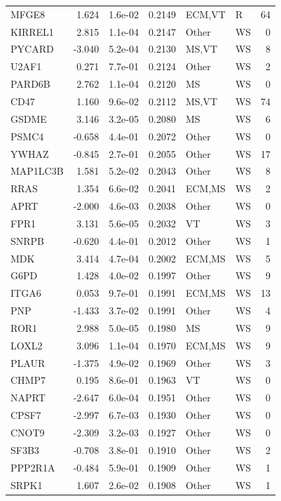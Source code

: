 \begin{table}[ht]
\begin{tabular}{lrlrllr}
  MFGE8 & 1.624 & 1.6e-02 & 0.2149 & ECM,VT & R & 64 \\ 
  KIRREL1 & 2.815 & 1.1e-04 & 0.2147 & Other & WS & 0 \\ 
  PYCARD & -3.040 & 5.2e-04 & 0.2130 & MS,VT & WS & 8 \\ 
  U2AF1 & 0.271 & 7.7e-01 & 0.2124 & Other & WS & 2 \\ 
  PARD6B & 2.762 & 1.1e-04 & 0.2120 & MS & WS & 0 \\ 
  CD47 & 1.160 & 9.6e-02 & 0.2112 & MS,VT & WS & 74 \\ 
  GSDME & 3.146 & 3.2e-05 & 0.2080 & MS & WS & 6 \\ 
  PSMC4 & -0.658 & 4.4e-01 & 0.2072 & Other & WS & 0 \\ 
  YWHAZ & -0.845 & 2.7e-01 & 0.2055 & Other & WS & 17 \\ 
  MAP1LC3B & 1.581 & 5.2e-02 & 0.2043 & Other & WS & 8 \\ 
  RRAS & 1.354 & 6.6e-02 & 0.2041 & ECM,MS & WS & 2 \\ 
  APRT & -2.000 & 4.6e-03 & 0.2038 & Other & WS & 0 \\ 
  FPR1 & 3.131 & 5.6e-05 & 0.2032 & VT & WS & 3 \\ 
  SNRPB & -0.620 & 4.4e-01 & 0.2012 & Other & WS & 1 \\ 
  MDK & 3.414 & 4.7e-04 & 0.2002 & ECM,MS & WS & 5 \\ 
  G6PD & 1.428 & 4.0e-02 & 0.1997 & Other & WS & 9 \\ 
  ITGA6 & 0.053 & 9.7e-01 & 0.1991 & ECM,MS & WS & 13 \\ 
  PNP & -1.433 & 3.7e-02 & 0.1991 & Other & WS & 4 \\ 
  ROR1 & 2.988 & 5.0e-05 & 0.1980 & MS & WS & 9 \\ 
  LOXL2 & 3.096 & 1.1e-04 & 0.1970 & ECM,MS & WS & 9 \\ 
  PLAUR & -1.375 & 4.9e-02 & 0.1969 & Other & WS & 3 \\ 
  CHMP7 & 0.195 & 8.6e-01 & 0.1963 & VT & WS & 0 \\ 
  NAPRT & -2.647 & 6.0e-04 & 0.1951 & Other & WS & 0 \\ 
  CPSF7 & -2.997 & 6.7e-03 & 0.1930 & Other & WS & 0 \\ 
  CNOT9 & -2.309 & 3.2e-03 & 0.1927 & Other & WS & 0 \\ 
  SF3B3 & -0.708 & 3.8e-01 & 0.1910 & Other & WS & 2 \\ 
  PPP2R1A & -0.484 & 5.9e-01 & 0.1909 & Other & WS & 1 \\ 
  SRPK1 & 1.607 & 2.6e-02 & 0.1908 & Other & WS & 1 \\ 

\end{tabular}
\end{table}
